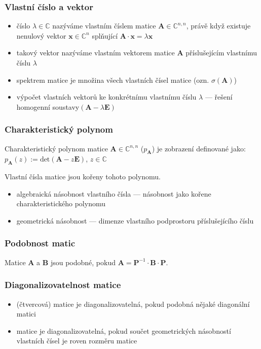 \subsubsection*{Vlastní číslo a vektor}
\begin{itemize}
	\item číslo $\lambda \in \mathbb{C}$ nazýváme vlastním číslem matice $\textbf{A} \in \mathbb{C}^{n,n}$, právě když existuje nenulový vektor $\textbf{x} \in \mathbb{C}^n$ splňující $\textbf{A} \cdot \textbf{x} = \lambda\textbf{x}$
	\item takový vektor nazýváme vlastním vektorem matice $\textbf{A}$ příslušejícím vlastnímu číslu $\lambda$
	\item spektrem matice je množina všech vlastních čísel matice (ozn. $\sigma(\textbf{A})$)
	
	\item výpočet vlastních vektorů ke konkrétnímu vlastnímu číslu $\lambda$ --- řešení homogenní soustavy$(\textbf{A} - \lambda \textbf{E})$
\end{itemize}

\subsubsection*{Charakteristický polynom}
Charakteristický polynom matice $\textbf{A} \in \mathbb{C}^{n,n}$ ($p_{\textbf{A}}$) je zobrazení definované jako: $p_{\textbf{A}}(z):= \text{det}(\textbf{A} - z\textbf{E})$, $z \in \mathbb{C}$

Vlastní čísla matice jsou kořeny tohoto polynomu.

\begin{itemize}
	\item algebraická násobnost vlastního čísla --- násobnost jako kořene charakteristického polynomu
	\item geometrická násobnost --- dimenze vlastního podprostoru příslušejícího číslu 
\end{itemize}

\subsubsection*{Podobnost matic}
Matice \textbf{A} a \textbf{B} jsou podobné, pokud $\textbf{A} = \textbf{P}^{-1} \cdot \textbf{B} \cdot \textbf{P}$.

\subsubsection*{Diagonalizovatelnost matice}
\begin{itemize}
	\item (čtvercová) matice je diagonalizovatelná, pokud podobná nějaké diagonální matici
	\item matice je diagonalizovatelná, pokud součet geometrických násobností vlastních čísel je roven rozměru matice
\end{itemize} 
